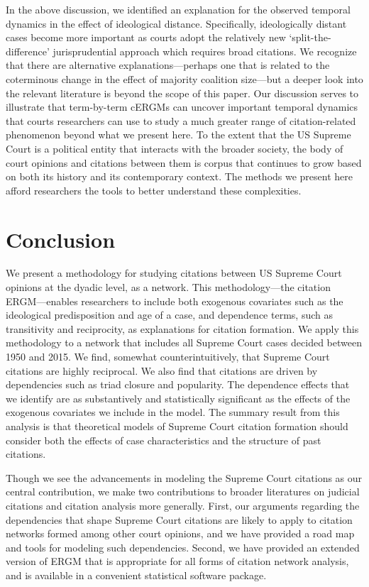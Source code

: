\documentclass[headsepline=true, abstracton]{scrartcl}
\begin{document}
In the above discussion, we identified an explanation for the observed temporal dynamics in the effect of ideological distance. Specifically, ideologically distant cases become more important as courts adopt the relatively new `split-the-difference' jurisprudential approach which requires broad citations. We recognize that there are alternative explanations---perhaps one that is related to the coterminous change in the effect of majority coalition size---but a deeper look into the relevant literature is beyond the scope of this paper. Our discussion serves to illustrate that term-by-term cERGMs can uncover important temporal dynamics that courts researchers can use to study a much greater range of citation-related phenomenon beyond what we present here. To the extent that the US Supreme Court is a political entity that interacts with the broader society, the body of court opinions and citations between them is corpus that continues to grow based on both its history and its contemporary context. The methods we present here afford researchers the tools to better understand these complexities.


\section{Conclusion}

We present a methodology for studying citations between US Supreme Court opinions at the dyadic level, as a network. This methodology---the citation ERGM---enables researchers to include both exogenous covariates such as the ideological predisposition and age of a case, and dependence terms, such as transitivity and reciprocity, as explanations for citation formation. We apply this methodology to a network that includes all Supreme Court cases decided between 1950 and 2015. We find, somewhat counterintuitively, that Supreme Court citations are highly reciprocal. We also find that citations are driven by dependencies such as triad closure and popularity. The dependence effects that we identify are as substantively and statistically significant as the effects of the exogenous covariates we include in the model. The summary result from this analysis is that theoretical models of Supreme Court citation formation should consider both the effects of case characteristics and the structure of past citations. 

Though we see the advancements in modeling the Supreme Court citations as our central contribution, we make two contributions to broader literatures on judicial citations and citation analysis more generally. First, our arguments regarding the dependencies that shape Supreme Court citations are likely to apply to citation networks formed among other court opinions, and we have provided a road map and tools for modeling such dependencies. Second, we have provided an extended version of ERGM that is appropriate for all forms of citation network analysis, and is available in a convenient statistical software package.
\end{document}
